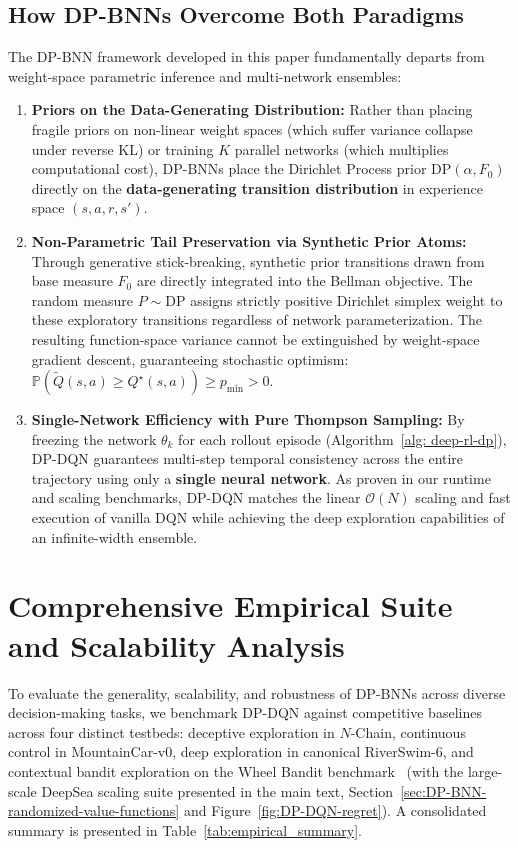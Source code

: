 \documentclass[10pt]{article}
\begin{document}
\subsection{How DP-BNNs Overcome Both Paradigms}
The DP-BNN framework developed in this paper fundamentally departs from weight-space parametric inference and multi-network ensembles:
\begin{enumerate}
    \item \textbf{Priors on the Data-Generating Distribution:} Rather than placing fragile priors on non-linear weight spaces (which suffer variance collapse under reverse KL) or training $K$ parallel networks (which multiplies computational cost), DP-BNNs place the Dirichlet Process prior $\text{DP}(\alpha, F_0)$ directly on the \textbf{data-generating transition distribution} in experience space $(s, a, r, s')$.
    \item \textbf{Non-Parametric Tail Preservation via Synthetic Prior Atoms:} Through generative stick-breaking, synthetic prior transitions drawn from base measure $F_0$ are directly integrated into the Bellman objective. The random measure $P \sim \text{DP}$ assigns strictly positive Dirichlet simplex weight to these exploratory transitions regardless of network parameterization. The resulting function-space variance cannot be extinguished by weight-space gradient descent, guaranteeing stochastic optimism: $\mathbb{P}(\tilde{Q}(s, a) \ge Q^\star(s, a)) \ge p_{\min} > 0$.
    \item \textbf{Single-Network Efficiency with Pure Thompson Sampling:} By freezing the network $\theta_k$ for each rollout episode (Algorithm~\ref{alg: deep-rl-dp}), DP-DQN guarantees multi-step temporal consistency across the entire trajectory using only a \textbf{single neural network}. As proven in our runtime and scaling benchmarks, DP-DQN matches the linear $\mathcal{O}(N)$ scaling and fast execution of vanilla DQN while achieving the deep exploration capabilities of an infinite-width ensemble.
\end{enumerate}

\section{Comprehensive Empirical Suite and Scalability Analysis}
\label{sec:empirical-suite}

To evaluate the generality, scalability, and robustness of DP-BNNs across diverse decision-making tasks, we benchmark DP-DQN against competitive baselines across four distinct testbeds: deceptive exploration in $N$-Chain, continuous control in MountainCar-v0, deep exploration in canonical RiverSwim-6, and contextual bandit exploration on the Wheel Bandit benchmark~\citep{riquelme2018deep} (with the large-scale DeepSea scaling suite presented in the main text, Section~\ref{sec:DP-BNN-randomized-value-functions} and Figure~\ref{fig:DP-DQN-regret}). A consolidated summary is presented in Table~\ref{tab:empirical_summary}.
\end{document}
